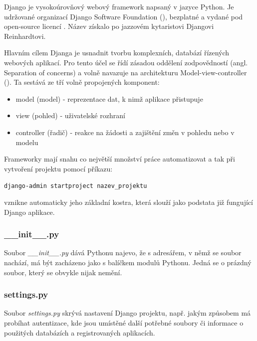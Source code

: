 
Django je vysokoúrovňový webový framework napsaný v jazyce Python. Je udržované organizací Django Software Foundation (), bezplatné a vydané pod open-source licencí . Název získalo po jazzovém kytaristovi Djangovi Reinhardtovi.

Hlavním cílem Djanga je usnadnit tvorbu komplexních, databází řízených webových aplikací. Pro tento účel se řídí zásadou oddělení zodpovědností (angl. Separation of concerns) a volně navazuje na architekturu Model-view-controller (). Ta sestává ze tří volně propojených komponent:
\begin{itemize}
\item model (model) - reprezentace dat, k nimž aplikace přistupuje
\item view (pohled) - uživatelské rozhraní
\item controller (řadič) - reakce na žádosti a zajištění změn v pohledu nebo v modelu
\end{itemize}

Frameworky mají snahu co největší množství práce automatizovat a tak při vytvoření projektu pomocí příkazu:

\begin{center}
\texttt{django-admin startproject nazev\_projektu}
\end{center}

vznikne automaticky jeho základní kostra, která slouží jako podstata již fungující Django aplikace.


\subsubsection{\_\_init\_\_.py}
Soubor \textit{\_\_init\_\_.py} dává Pythonu najevo, že s adresářem, v němž se soubor nachází, má být zacházeno jako s balíčkem modulů Pythonu. Jedná se o prázdný soubor, který se obvykle nijak nemění.

\subsubsection{settings.py}
Soubor \textit{settings.py} skrývá nastavení Django projektu, např. jakým způsobem má probíhat autentizace, kde jsou umístěné další potřebné soubory či informace o použitých databázích a registrovaných aplikacích.

